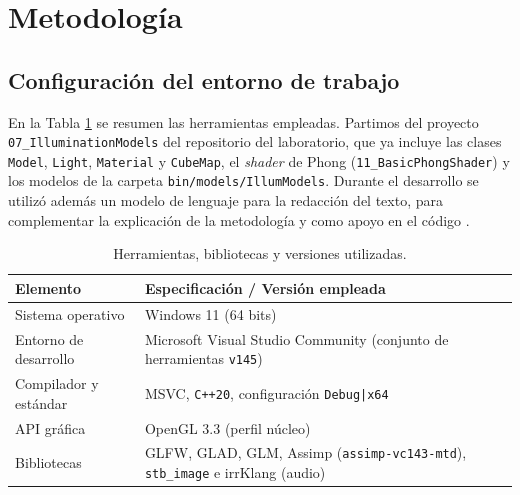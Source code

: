
\section{Metodología}

\subsection{Configuración del entorno de trabajo}
En la Tabla \ref{tab:requerimientos} se resumen las herramientas empleadas. Partimos del proyecto \texttt{07\_IlluminationModels} del repositorio del laboratorio, que ya incluye las clases \texttt{Model}, \texttt{Light}, \texttt{Material} y \texttt{CubeMap}, el \textit{shader} de Phong (\texttt{11\_BasicPhongShader}) y los modelos de la carpeta \texttt{bin/models/IllumModels}. Durante el desarrollo se utilizó además un modelo de lenguaje para la redacción del texto, para complementar la explicación de la metodología y como apoyo en el código \cite{anthropic2026}.

\begin{table}[H]
\centering
\renewcommand{\arraystretch}{1.25}
\begin{tabular}{|p{4.2cm}|p{10.5cm}|}
\hline
\textbf{Elemento} & \textbf{Especificación / Versión empleada} \\ \hline
Sistema operativo & Windows 11 (64 bits) \\ \hline
Entorno de desarrollo & Microsoft Visual Studio Community (conjunto de herramientas \texttt{v145}) \\ \hline
Compilador y estándar & MSVC, \texttt{C++20}, configuración \texttt{Debug|x64} \\ \hline
API gráfica & OpenGL 3.3 (perfil núcleo) \\ \hline
Bibliotecas & GLFW, GLAD, GLM, Assimp (\texttt{assimp-vc143-mtd}), \texttt{stb\_image} e irrKlang (audio) \\ \hline
\end{tabular}
\caption{Herramientas, bibliotecas y versiones utilizadas.}
\label{tab:requerimientos}
\end{table}

